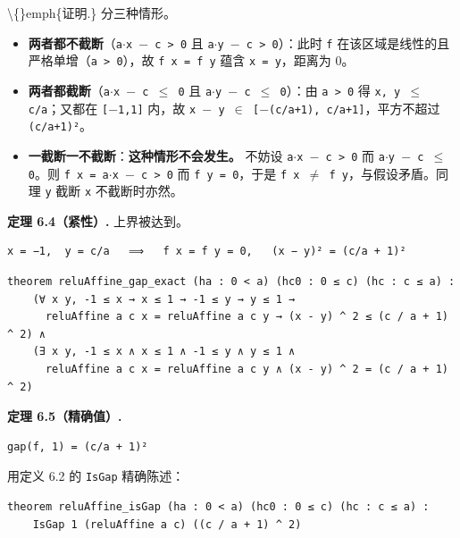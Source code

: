 \documentclass[11pt,a4paper]{ctexart}
\begin{document}
\textbackslash\{\}emph\{证明.\} 分三种情形。

\begin{itemize}
\item \textbf{两者都不截断}（\texttt{a\ensuremath{\cdot}x \ensuremath{-} c > 0} 且 \texttt{a\ensuremath{\cdot}y \ensuremath{-} c > 0}）：此时 \texttt{f} 在该区域是线性的且严格单增（\texttt{a > 0}），故 \texttt{f x = f y} 蕴含 \texttt{x = y}，距离为 0。
\item \textbf{两者都截断}（\texttt{a\ensuremath{\cdot}x \ensuremath{-} c \ensuremath{\le} 0} 且 \texttt{a\ensuremath{\cdot}y \ensuremath{-} c \ensuremath{\le} 0}）：由 \texttt{a > 0} 得 \texttt{x, y \ensuremath{\le} c/a}；又都在 \texttt{[\ensuremath{-}1,1]} 内，故 \texttt{x \ensuremath{-} y \ensuremath{\in} [\ensuremath{-}(c/a+1), c/a+1]}，平方不超过 \texttt{(c/a+1)²}。
\item \textbf{一截断一不截断}：\textbf{这种情形不会发生。} 不妨设 \texttt{a\ensuremath{\cdot}x \ensuremath{-} c > 0} 而 \texttt{a\ensuremath{\cdot}y \ensuremath{-} c \ensuremath{\le} 0}。则 \texttt{f x = a\ensuremath{\cdot}x \ensuremath{-} c > 0} 而 \texttt{f y = 0}，于是 \texttt{f x \ensuremath{\ne} f y}，与假设矛盾。同理 \texttt{y} 截断 \texttt{x} 不截断时亦然。
\end{itemize}

\textbf{定理 6.4（紧性）.} 上界被达到。

\begin{lstlisting}
x = −1,  y = c/a   ⟹   f x = f y = 0,   (x − y)² = (c/a + 1)²
\end{lstlisting}

\begin{lstlisting}
theorem reluAffine_gap_exact (ha : 0 < a) (hc0 : 0 ≤ c) (hc : c ≤ a) :
    (∀ x y, -1 ≤ x → x ≤ 1 → -1 ≤ y → y ≤ 1 →
      reluAffine a c x = reluAffine a c y → (x - y) ^ 2 ≤ (c / a + 1) ^ 2) ∧
    (∃ x y, -1 ≤ x ∧ x ≤ 1 ∧ -1 ≤ y ∧ y ≤ 1 ∧
      reluAffine a c x = reluAffine a c y ∧ (x - y) ^ 2 = (c / a + 1) ^ 2)
\end{lstlisting}

\textbf{定理 6.5（精确值）.}

\begin{lstlisting}
gap(f, 1) = (c/a + 1)²
\end{lstlisting}

用定义 6.2 的 \texttt{IsGap} 精确陈述：

\begin{lstlisting}
theorem reluAffine_isGap (ha : 0 < a) (hc0 : 0 ≤ c) (hc : c ≤ a) :
    IsGap 1 (reluAffine a c) ((c / a + 1) ^ 2)
\end{lstlisting}
\end{document}
